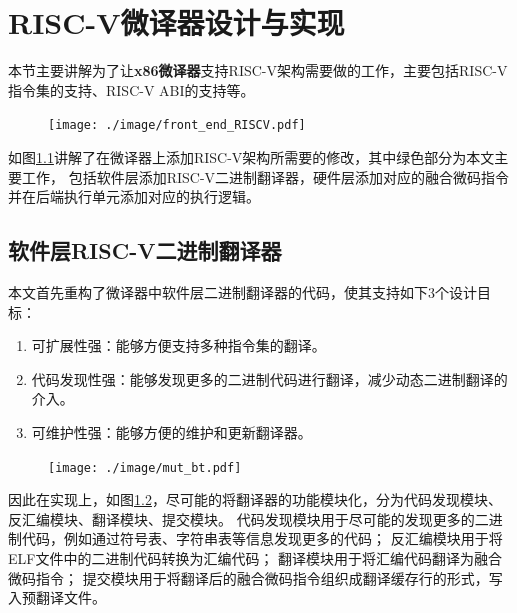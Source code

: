 \chapter{RISC-V微译器设计与实现}\label{chap:RISC-V}

本节主要讲解为了让\textbf{x86微译器}支持RISC-V架构需要做的工作，主要包括RISC-V指令集的支持、RISC-V ABI的支持等。

\begin{figure}[!htbp]
  \centering
  \texttt{[image: ./image/front\_end\_RISCV.pdf]}
  \label{img:front_end_riscv}
\end{figure}

如图\ref{img:front_end_riscv}讲解了在微译器上添加RISC-V架构所需要的修改，其中绿色部分为本文主要工作，
包括软件层添加RISC-V二进制翻译器，硬件层添加对应的融合微码指令并在后端执行单元添加对应的执行逻辑。

\section{软件层RISC-V二进制翻译器}

本文首先重构了微译器中软件层二进制翻译器的代码，使其支持如下3个设计目标：
\begin{enumerate}
  \item 可扩展性强：能够方便支持多种指令集的翻译。
  \item 代码发现性强：能够发现更多的二进制代码进行翻译，减少动态二进制翻译的介入。
  \item 可维护性强：能够方便的维护和更新翻译器。
\end{enumerate}

\begin{figure}[!htbp]
  \centering
  \texttt{[image: ./image/mut\_bt.pdf]}
  \label{img:mut_bt}
\end{figure}

因此在实现上，如图\ref{img:mut_bt}，尽可能的将翻译器的功能模块化，分为代码发现模块、反汇编模块、翻译模块、提交模块。
代码发现模块用于尽可能的发现更多的二进制代码，例如通过符号表、字符串表等信息发现更多的代码；
反汇编模块用于将ELF文件中的二进制代码转换为汇编代码；
翻译模块用于将汇编代码翻译为融合微码指令；
提交模块用于将翻译后的融合微码指令组织成翻译缓存行的形式，写入预翻译文件。

